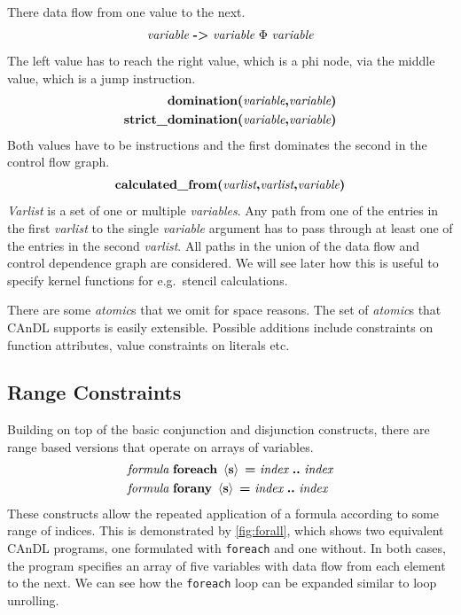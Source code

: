     There data flow from one value to the next.
    \begin{align*}
        \text{\it variable}\ \text{\bf ->}\ \text{\it variable}\ \Phi\ \text{\it variable}
    \end{align*}
    The left value has to reach the right value, which is a phi node, via the middle value, which is a jump instruction.
    \begin{align*}
        \text{\bf domination(}\text{\it variable}\text{\bf,} \text{\it variable}\text{\bf)}&\\
        \text{\bf strict\_domination(}\text{\it variable}\text{\bf,} \text{\it variable}\text{\bf)}&
    \end{align*}
    Both values have to be instructions and the first dominates the second in the control flow graph.
    \begin{align*}
        \text{\bf calculated\_from(}\text{\it varlist}\text{\bf,}\text{\it varlist}\text{\bf,}\text{\it variable}\text{\bf)}
    \end{align*}
    {\it Varlist} is a set of one or multiple {\it variables}.
    Any path from one of the entries in the first {\it varlist} to the single
    {\it variable} argument has to pass through at least one of the entries in
    the second {\it varlist}.
    All paths in the union of the data flow and control dependence graph are
    considered.
    We will see later how this is useful to specify kernel functions for
    e.g.\ stencil calculations.

    There are some {\it atomic}s that we omit for space reasons.
    The set of {\it atomic}s that CAnDL supports is easily extensible.
    Possible additions include constraints on function attributes, value
    constraints on literals etc.

\subsection{Range Constraints}

    Building on top of the basic conjunction and disjunction constructs, there
    are range based versions that operate on arrays of variables.
    \begin{align*}
        \text{\it formula}\ &\text{\bf foreach}\ \left<\text{\bf s}\right>\ \text{\bf =}\ \text{\it index}\ \text{\bf ..}\ \text{\it index}\\
        \text{\it formula}\ &\text{\bf forany}\ \left<\text{\bf s}\right>\ \text{\bf =}\ \text{\it index}\ \text{\bf ..}\ \text{\it index}
    \end{align*}
    These constructs allow the repeated application of a formula according to
    some range of indices.
    This is demonstrated by \autoref{fig:forall}, which shows two equivalent
    CAnDL programs, one formulated with \texttt{foreach} and one without.
    In both cases, the program specifies an array of five variables with data
    flow from each element to the next.
    We can see how the \texttt{foreach} loop can be expanded similar to loop
    unrolling.

